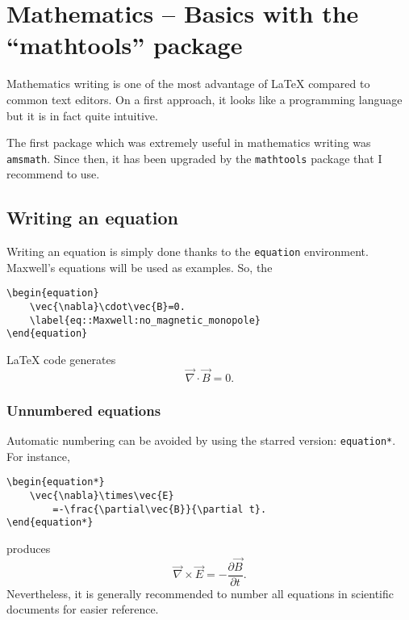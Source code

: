 

\chapter{Mathematics -- Basics with the \enquote{mathtools} package}

Mathematics writing is one of the most advantage of \LaTeX{} compared to common text editors.
On a first approach, it looks like a programming language but it is in fact quite intuitive.

The first package which was extremely useful in mathematics writing was \texttt{amsmath}.
Since then, it has been upgraded by the \texttt{mathtools} package that I recommend to use.


\section{Writing an equation}

	Writing an equation is simply done thanks to the \texttt{equation} environment.
	Maxwell's equations will be used as examples.
	So, the 
\begin{lstlisting}[language={[LaTeX]TeX}]
\begin{equation}
	\vec{\nabla}\cdot\vec{B}=0.
	\label{eq::Maxwell:no_magnetic_monopole}
\end{equation}
\end{lstlisting}
	\LaTeX{} code generates
	\begin{equation}
		\vec{\nabla}\cdot\vec{B}=0.
		\label{eq::Maxwell:no_magnetic_monopole}
	\end{equation}
	
	
	\subsection{Unnumbered equations}
	
		Automatic numbering can be avoided by using the starred version: \texttt{equation*}.
		For instance,
\begin{lstlisting}[language={[LaTeX]TeX}]
\begin{equation*}
	\vec{\nabla}\times\vec{E}
		=-\frac{\partial\vec{B}}{\partial t}.
\end{equation*}
\end{lstlisting}	
produces
		\begin{equation*}
			\vec{\nabla}\times\vec{E}
				=-\frac{\partial\vec{B}}{\partial t}.
		\end{equation*}
		Nevertheless, it is generally recommended to number all equations in scientific documents for easier reference.
		
